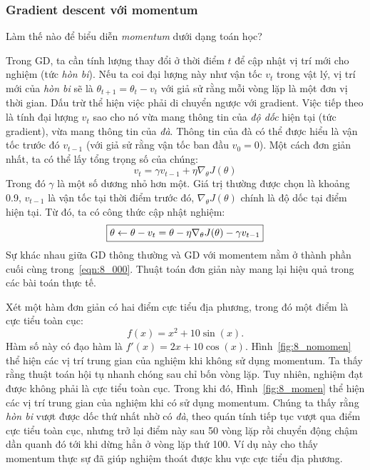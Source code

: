 \subsubsection{Gradient descent với momentum}
Làm thế nào để biểu diễn \textit{momentum} dưới dạng toán học?

Trong GD, ta cần tính lượng thay đổi ở thời điểm $t$ để cập nhật vị trí
mới cho nghiệm (tức \textit{hòn bi}). Nếu ta coi đại lượng này như vận tốc
$v_t$ trong vật lý, vị trí mới của \textit{hòn bi} sẽ là $\theta_{t+1} =
\theta_{t} - v_t$ với giả sử rằng mỗi vòng lặp là một đơn vị thời gian. Dấu trừ
thể hiện việc phải di chuyển ngược với gradient. Việc tiếp theo là tính đại lượng
$v_t$ sao cho nó vừa mang thông tin của \textit{độ dốc} hiện tại (tức gradient),
vừa mang thông tin của \textit{đà}. Thông tin của đà có thể được hiểu là vận tốc
trước đó $v_{t-1}$ (với giả sử rằng vận tốc ban đầu $v_0=0$). Một cách đơn giản
nhất, ta có thể lấy tổng trọng số của chúng:
\begin{equation}
\boxed{v_{t}= \gamma v_{t-1} + \eta \nabla_{\theta}J(\theta)}
\end{equation}
Trong đó $\gamma$ là một số dương nhỏ hơn một. Giá trị thường được chọn là khoảng 0.9, $v_{t-1}$ là vận tốc tại thời điểm trước đó, $ \nabla_{\theta}J(\theta)$ chính là độ dốc tại điểm hiện tại. Từ đó, ta có công thức cập nhật nghiệm:
\begin{equation}
\label{eqn:8_000}
\boxed{\theta \leftarrow \theta - v_t = \theta  - \eta \nabla_{\theta}J(\theta)- \gamma
v_{t-1}}
\end{equation}
Sự khác nhau giữa GD thông thường và GD với momentem nằm ở thành phần cuối
cùng trong~\eqref{eqn:8_000}. Thuật toán đơn giản này mang lại hiệu quả trong
các bài toán thực tế. %

Xét một hàm đơn giản có hai
điểm cực tiểu địa phương, trong đó một điểm là cực tiểu toàn cục:
\begin{equation}
f(x) = x^2 + 10\sin(x).
\end{equation}
Hàm số này có đạo hàm là $f'(x) = 2x + 10\cos(x)$. Hình~\ref{fig:8_nomomen} thể
hiện các vị trí trung gian của nghiệm khi không sử dụng momentum. Ta thấy rằng
thuật toán hội tụ nhanh chóng sau chỉ bốn vòng lặp. Tuy nhiên, nghiệm đạt được
không phải là cực tiểu toàn cục. Trong khi đó, Hình~\ref{fig:8_momen} thể hiện các
vị trí trung gian của nghiệm khi có sử dụng momentum. Chúng ta thấy rằng
\textit{hòn bi} vượt được dốc thứ nhất nhờ có \textit{đà}, theo quán tính tiếp
tục vượt qua điểm cực tiểu toàn cục, nhưng trở lại điểm này sau 50 vòng lặp
rồi chuyển động chậm dần quanh đó tới khi dừng hẳn ở vòng lặp thứ 100. Ví dụ này
cho thấy momentum thực sự đã giúp nghiệm thoát được khu vực cực tiểu địa phương.

